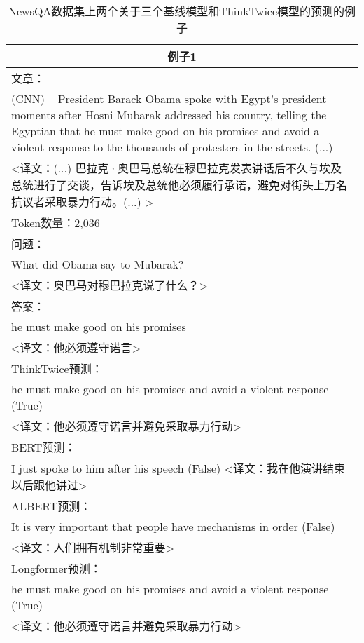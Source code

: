 \begin{table}[htbp]\scriptsize
    \centering
    \caption{NewsQA数据集上两个关于三个基线模型和ThinkTwice模型的预测的例子}
    \begin{tabular}{p{408pt}}
        \hline
        \multicolumn{1}{c}{\bfseries 例子1} \\
        \hline
        文章：\\
        (CNN) -- President Barack Obama spoke with Egypt's president moments after Hosni Mubarak addressed his country, telling the Egyptian that \textcolor[rgb]{1,0,0.2}{he must make good on his promises} and avoid a violent response to the thousands of protesters in the streets. (...) \\
        <译文：(...) 巴拉克·奥巴马总统在穆巴拉克发表讲话后不久与埃及总统进行了交谈，告诉埃及总统他必须履行承诺，避免对街头上万名抗议者采取暴力行动。(...) > \\
        \hline
        Token数量：2,036 \\
        \hline
        问题：\\
        What did Obama say to Mubarak? \\
        <译文：奥巴马对穆巴拉克说了什么？> \\
        \hline
        答案：\\
        he must make good on his promises \\
        <译文：他必须遵守诺言> \\
        \hline
        ThinkTwice预测：\\
        \textcolor[rgb]{1,0,0.2}{he must make good on his promises and avoid a violent response} (True) \\
        <译文：他必须遵守诺言并避免采取暴力行动> \\
        \hline
        BERT预测：\\
        I just spoke to him after his speech (False)
        <译文：我在他演讲结束以后跟他讲过> \\
        \hline
        ALBERT预测：\\
        It is very important that people have mechanisms in order (False) \\
        <译文：人们拥有机制非常重要> \\
        \hline
        Longformer预测：\\
        he must make good on his promises and avoid a violent response (True) \\
        <译文：他必须遵守诺言并避免采取暴力行动> \\
        \hline

\end{tabular}
\end{table}
